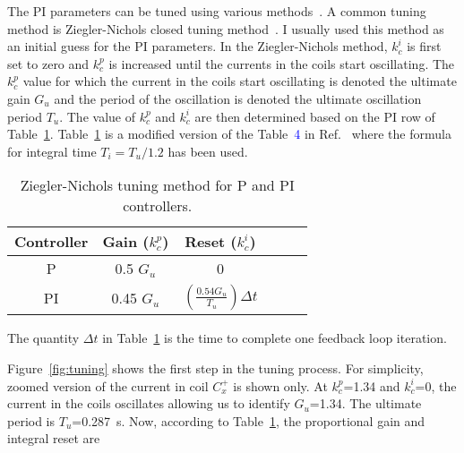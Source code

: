 The PI parameters can be tuned using various methods~\cite{tuning}. A common tuning method is Ziegler-Nichols closed tuning method~\cite{tuning_ZN}. I usually used this method as an initial guess for the PI parameters. In the Ziegler-Nichols method, $k_c^i$ is first set to zero and $k_c^p$ is increased until the currents in the coils start oscillating. The $k_c^p$ value for which the current in the coils start oscillating is denoted the ultimate gain $G_{u}$ and the period of the oscillation is denoted the ultimate oscillation period $T_u$. The value of $k_c^p$ and $k_c^i$ are then determined based on the PI row of Table~\ref{table:tuning}. Table~\ref{table:tuning} is a modified version of the Table~\textcolor{blue}{4} in Ref.~\cite{tuning_formula} where the formula for integral time $T_i=T_u/1.2$ has been used. 

\begin{table} [htb!]
    \centering
    \begin{tabular} { |c|c|c|c|c|c|} 
        \hline
        Controller & Gain ($k_c^p$) & Reset ($k_c^i$)\\
        \hline\hline
         P & 0.5 $G_u$ & 0 \\ 
        \hline
         PI & 0.45 $G_u$ & $\left(\frac{\text{0.54} G_u}{T_u}\right)\Delta t$ \\ 
        \hline
    \end{tabular}
    \caption{Ziegler-Nichols tuning method for P and PI controllers.}\label{table:tuning}
\end{table}


The quantity $\Delta t$ in Table~\ref{table:tuning} is the time to complete one feedback loop iteration.

Figure~\ref{fig:tuning} shows the first step in the tuning process. For simplicity, zoomed version of the current in coil $C_x^+$ is shown only. At $k_c^p$=1.34 and $k_c^i$=0, the current in the coils oscillates allowing us to identify $G_u$=1.34.  The ultimate period is $T_u$=0.287~s. Now, according to Table~\ref{table:tuning}, the proportional gain and integral reset are

